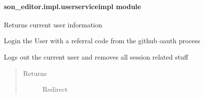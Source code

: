 \documentclass[letterpaper,10pt,english]{sphinxmanual}
\begin{document}
\paragraph{son\_editor.impl.userserviceimpl module}
\label{_source/son_editor.impl:son-editor-impl-userserviceimpl-module}\label{_source/son_editor.impl:module-son_editor.impl.userserviceimpl}

\begin{fulllineitems}
\label{_source/son_editor.impl:son_editor.impl.userserviceimpl.get_user_info}
Returns current user information

\end{fulllineitems}


\begin{fulllineitems}
\label{_source/son_editor.impl:son_editor.impl.userserviceimpl.login}
Login the User with a referral code from the github oauth process

\end{fulllineitems}


\begin{fulllineitems}
\label{_source/son_editor.impl:son_editor.impl.userserviceimpl.logout}
Logs out the current user and removes all session related stuff
\begin{quote}\begin{description}
\item[{Returns}] \leavevmode
Redirect

\end{description}\end{quote}

\end{fulllineitems}


\begin{fulllineitems}
\label{_source/son_editor.impl:son_editor.impl.userserviceimpl.origin_from_referrer}
\end{fulllineitems}
\end{document}
